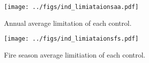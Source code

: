

\begin{figure}[!ht]
  \centering
    \texttt{[image: ../figs/ind\_limiataionsaa.pdf]}
  \caption{Annual average limitation of each control.}
  \label{fig:Annual_average_con}
\end{figure}

\begin{figure}[!ht]
  \centering
    \texttt{[image: ../figs/ind\_limiataionsfs.pdf]}
  \caption{Fire season average limitiation of each control.}
  \label{fig:Season_con}
\end{figure}



